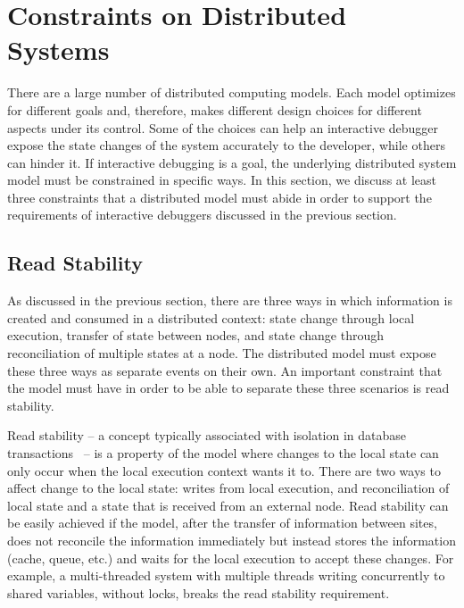 \section{Constraints on Distributed Systems}
\label{sec:ideal_model}

There are a large number of distributed computing models. Each model optimizes for different goals and, therefore, makes different design choices for different aspects under its control. Some of the choices can help an interactive debugger expose the state changes of the system accurately to the developer, while others can hinder it. If interactive debugging is a goal, the underlying distributed system model must be constrained in specific ways. In this section, we discuss at least three constraints that a distributed model must abide in order to support the requirements of interactive debuggers discussed in the previous section.

\subsection{Read Stability}
As discussed in the previous section, there are three ways in which information is created and consumed in a distributed context: state change through local execution, transfer of state between nodes, and state change through reconciliation of multiple states at a node. The distributed model must expose these three ways as separate events on their own. An important constraint that the model must have in order to be able to separate these three scenarios is read stability.

Read stability -- a concept typically associated with isolation in database transactions~\cite{readstability} -- is a property of the model where changes to the local state can only occur when the local execution context wants it to. There are two ways to affect change to the local state: writes from local execution, and reconciliation of local state and a state that is received from an external node. Read stability can be easily achieved if the model, after the transfer of information between sites, does not reconcile the information immediately but instead stores the information (cache, queue, etc.) and waits for the local execution to accept these changes. For example, a multi-threaded system with multiple threads writing concurrently to shared variables, without locks, breaks the read stability requirement.

